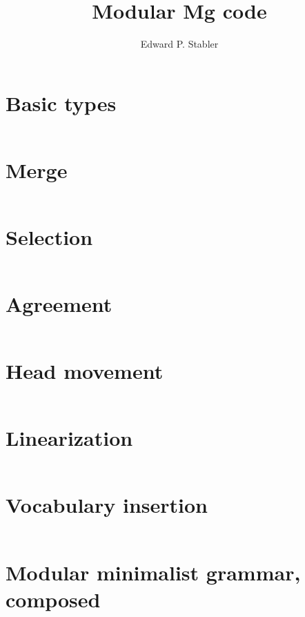\documentclass{article}
\title{Modular Mg code}
\author{Edward P. Stabler}
\begin{document}
\thispagestyle{empty}

\setcounter{section}{-1}

\eject
\section{Basic types}
%
\inputminted[fontsize=\footnotesize]{haskell}{MgTypes.hs}

\section{Merge}
%
\inputminted[fontsize=\footnotesize]{haskell}{Mrg.hs}

\section{Selection}
%
\inputminted[fontsize=\footnotesize]{haskell}{Sel.hs}

\eject
\section{Agreement}
%
\inputminted[fontsize=\footnotesize]{haskell}{Agr.hs}

\vfill\eject
\section{Head movement}
%
\inputminted[fontsize=\footnotesize]{haskell}{Hm.hs}

\section{Linearization}
%
\inputminted[fontsize=\footnotesize]{haskell}{Lin.hs}

\eject
\section{Vocabulary insertion}
%
\inputminted[fontsize=\footnotesize]{haskell}{Vi.hs}

\section{Modular minimalist grammar, composed}
\inputminted[fontsize=\footnotesize]{haskell}{Mg.hs}
\end{document}
